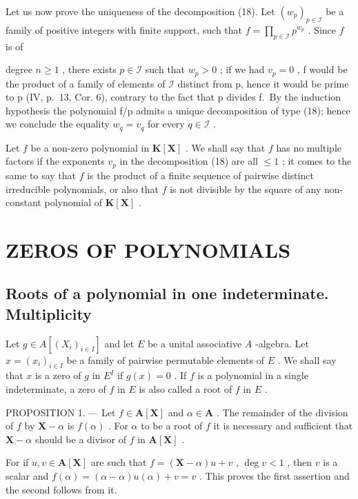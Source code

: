 Let us now prove the uniqueness of the decomposition (18). Let \((w_{p})_{p\in \mathcal{I}}\) be a family of positive integers with finite support, such that \(f = \prod_{p\in \mathcal{I}}p^{w_p}\) . Since \(f\) is of

degree \(n \geqslant 1\) , there exists \(p \in \mathcal{I}\) such that \(w_{p} > 0\) ; if we had \(v_{p} = 0\) , f would be the product of a family of elements of \(\mathcal{I}\) distinct from p, hence it would be prime to p (IV, p.~13, Cor. 6), contrary to the fact that p divides f.~By the induction hypothesis the polynomial f/p admits a unique decomposition of type (18); hence we conclude the equality \(w_{q} = v_{q}\) for every \(q \in \mathcal{I}\) .

Let \(f\) be a non-zero polynomial in \(\mathbf{K}[\mathbf{X}]\) . We shall say that \(f\) has no multiple factors if the exponents \(v_{p}\) in the decomposition (18) are all \(\leqslant 1\) ; it comes to the same to say that \(f\) is the product of a finite sequence of pairwise distinct irreducible polynomials, or also that \(f\) is not divisible by the square of any non-constant polynomial of \(\mathbf{K}[\mathbf{X}]\) .

\section{ZEROS OF POLYNOMIALS}

\subsection{Roots of a polynomial in one indeterminate. Multiplicity}

Let \(g \in A[(X_i)_{i \in I}]\) and let \(E\) be a unital associative \(A\) -algebra. Let \(x = (x_i)_{i \in I}\) be a family of pairwise permutable elements of \(E\) . We shall say that \(x\) is a zero of \(g\) in \(E^{I}\) if \(g(x) = 0\) . If \(f\) is a polynomial in a single indeterminate, a zero of \(f\) in \(E\) is also called a root of \(f\) in \(E\) .

PROPOSITION 1. --- Let \(f \in \mathbf{A}[\mathbf{X}]\) and \(\alpha \in \mathbf{A}\) . The remainder of the division of \(f\) by \(\mathbf{X} - \alpha\) is \(f(\alpha)\) . For \(\alpha\) to be a root of \(f\) it is necessary and sufficient that \(\mathbf{X} - \alpha\) should be a divisor of \(f\) in \(\mathbf{A}[\mathbf{X}]\) .

For if \(u, v \in \mathbf{A}[\mathbf{X}]\) are such that \(f = (\mathbf{X} - \alpha)u + v\) , \(\deg v < 1\) , then \(v\) is a scalar and \(f(\alpha) = (\alpha - \alpha)u(\alpha) + v = v\) . This proves the first assertion and the second follows from it.


